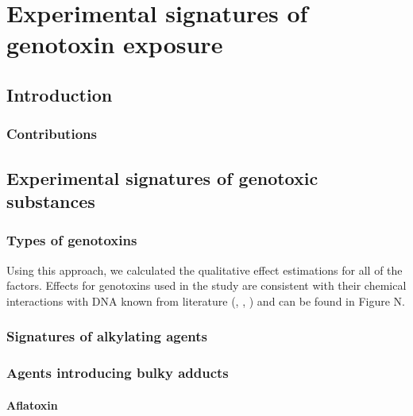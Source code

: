 

\pagestyle{empty}

\chapter{Experimental signatures of genotoxin exposure}

\section{Introduction}


\subsection*{Contributions}


\section{Experimental signatures of genotoxic substances}

\subsection{Types of genotoxins}

Using this approach, we calculated the qualitative effect estimations for all of the factors. Effects for genotoxins used in the study are consistent with their chemical interactions with DNA known from literature (\cite{Helleday}, \cite{DNAdamagerepair}, \cite{Meier1}) and can be found in Figure N.

\subsection{Signatures of alkylating agents}

\subsection{Agents introducing bulky adducts}

\subsubsection{Aflatoxin}

